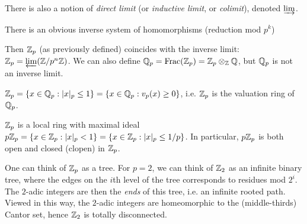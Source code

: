 \begin{remark}
  There is also a notion of \emph{direct limit}
  (or \emph{inductive limit}, or \emph{colimit}),
  denoted $\varinjlim$.
\end{remark}

\begin{remark}
  There is an obvious inverse system of homomorphisms (reduction mod $p^k$)
  \begin{center}
  \end{center}
  Then $\mathbb{Z}_p$ (as previously defined) coincides
  with the inverse limit:
  $\mathbb{Z}_p = \varprojlim (\mathbb{Z} / p^n \mathbb{Z})$. We can also
  define $\mathbb{Q}_p = \operatorname{Frac}(\mathbb{Z}_p) = \mathbb{Z}_p \otimes_{\mathbb{Z}} \mathbb{Q}$,
  but $\mathbb{Q}_p$ is not an inverse limit.
\end{remark}

\begin{lemma}
  $\mathbb{Z}_p = \{x \in \mathbb{Q}_p : |x|_p \le 1\} = \{x \in \mathbb{Q}_p : v_p(x) \ge 0\}$, i.e.
  $\mathbb{Z}_p$ is the valuation ring of $\mathbb{Q}_p$.
\end{lemma}

\begin{lemma}
  $\mathbb{Z}_p$ is a local ring with maximal ideal
  $p \mathbb{Z}_p = \{x \in \mathbb{Z}_p : |x|_p < 1\} = \{x \in \mathbb{Z}_p : |x|_p \le 1 / p\}$.
  In particular, $p \mathbb{Z}_p$ is both open and closed
  (clopen) in $\mathbb{Z}_p$.
\end{lemma}

\begin{remark}
  One can think of $\mathbb{Z}_p$ as a tree. For
  $p = 2$, we can think of $\mathbb{Z}_2$ as an infinite binary
  tree, where the edges on the $i$th level of the tree
  corresponds to residues mod $2^i$. The
  $2$-adic integers are then the \emph{ends} of this
  tree, i.e. an infinite rooted path. Viewed in
  this way, the $2$-adic integers are homeomorphic
  to the (middle-thirds) Cantor set, hence $\mathbb{Z}_2$ is
  totally disconnected.
\end{remark}
